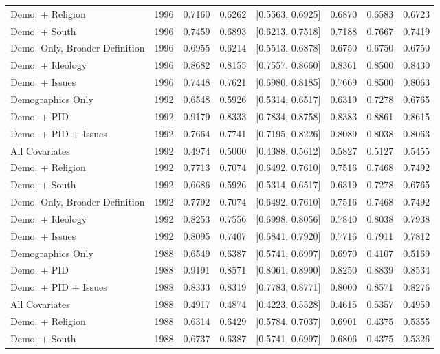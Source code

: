 \begin{longtable}{lrrrlrrr}
  Demo. + Religion & 1996 & 0.7160 & 0.6262 & [0.5563, 0.6925] & 0.6870 & 0.6583 & 0.6723 \\ 
  Demo. + South & 1996 & 0.7459 & 0.6893 & [0.6213, 0.7518] & 0.7188 & 0.7667 & 0.7419 \\ 
  Demo. Only, Broader Definition & 1996 & 0.6955 & 0.6214 & [0.5513, 0.6878] & 0.6750 & 0.6750 & 0.6750 \\ 
  Demo. + Ideology & 1996 & 0.8682 & 0.8155 & [0.7557, 0.8660] & 0.8361 & 0.8500 & 0.8430 \\ 
  Demo. + Issues & 1996 & 0.7448 & 0.7621 & [0.6980, 0.8185] & 0.7669 & 0.8500 & 0.8063 \\ 
  Demographics Only & 1992 & 0.6548 & 0.5926 & [0.5314, 0.6517] & 0.6319 & 0.7278 & 0.6765 \\ 
  Demo. + PID & 1992 & 0.9179 & 0.8333 & [0.7834, 0.8758] & 0.8383 & 0.8861 & 0.8615 \\ 
  Demo. + PID + Issues & 1992 & 0.7664 & 0.7741 & [0.7195, 0.8226] & 0.8089 & 0.8038 & 0.8063 \\ 
  All Covariates & 1992 & 0.4974 & 0.5000 & [0.4388, 0.5612] & 0.5827 & 0.5127 & 0.5455 \\ 
  Demo. + Religion & 1992 & 0.7713 & 0.7074 & [0.6492, 0.7610] & 0.7516 & 0.7468 & 0.7492 \\ 
  Demo. + South & 1992 & 0.6686 & 0.5926 & [0.5314, 0.6517] & 0.6319 & 0.7278 & 0.6765 \\ 
  Demo. Only, Broader Definition & 1992 & 0.7792 & 0.7074 & [0.6492, 0.7610] & 0.7516 & 0.7468 & 0.7492 \\ 
  Demo. + Ideology & 1992 & 0.8253 & 0.7556 & [0.6998, 0.8056] & 0.7840 & 0.8038 & 0.7938 \\ 
  Demo. + Issues & 1992 & 0.8095 & 0.7407 & [0.6841, 0.7920] & 0.7716 & 0.7911 & 0.7812 \\ 
  Demographics Only & 1988 & 0.6549 & 0.6387 & [0.5741, 0.6997] & 0.6970 & 0.4107 & 0.5169 \\ 
  Demo. + PID & 1988 & 0.9191 & 0.8571 & [0.8061, 0.8990] & 0.8250 & 0.8839 & 0.8534 \\ 
  Demo. + PID + Issues & 1988 & 0.8333 & 0.8319 & [0.7783, 0.8771] & 0.8000 & 0.8571 & 0.8276 \\ 
  All Covariates & 1988 & 0.4917 & 0.4874 & [0.4223, 0.5528] & 0.4615 & 0.5357 & 0.4959 \\ 
  Demo. + Religion & 1988 & 0.6314 & 0.6429 & [0.5784, 0.7037] & 0.6901 & 0.4375 & 0.5355 \\ 
  Demo. + South & 1988 & 0.6737 & 0.6387 & [0.5741, 0.6997] & 0.6806 & 0.4375 & 0.5326 \\ 

\end{longtable}

